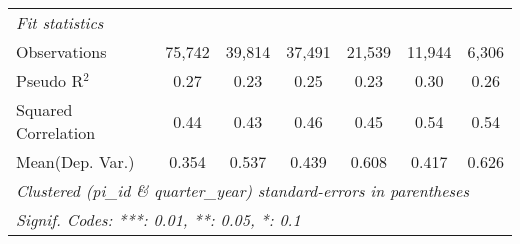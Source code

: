 \begin{tabular}{lcccccc}
   \midrule
   \emph{Fit statistics}\\
   Observations                                               & 75,742        & 39,814        & 37,491        & 21,539        & 11,944  & 6,306\\  
   Pseudo R$^2$                                               & 0.27          & 0.23          & 0.25          & 0.23          & 0.30    & 0.26\\  
   Squared Correlation                                        & 0.44          & 0.43          & 0.46          & 0.45          & 0.54    & 0.54\\  
Mean(Dep. Var.) & 0.354 & 0.537 & 0.439 & 0.608 & 0.417 & 0.626 \\
   \midrule \midrule
   \multicolumn{7}{l}{\emph{Clustered (pi\_id \& quarter\_year) standard-errors in parentheses}}\\
   \multicolumn{7}{l}{\emph{Signif. Codes: ***: 0.01, **: 0.05, *: 0.1}}\\
\end{tabular}
\par\endgroup

